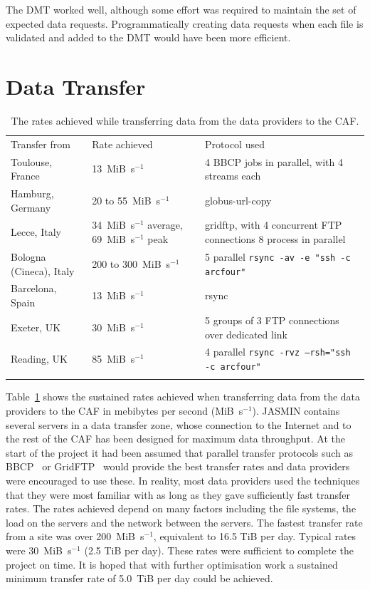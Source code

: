 \documentclass[gmd, manuscript]{copernicus}
\begin{document}
The DMT worked well, although some effort was required to maintain the set of expected data requests. Programmatically creating data requests  when each file is validated and added to the DMT would have been more efficient.

\section{Data Transfer}
\label{transfer_rates}

\begin{table}[ht]
	\caption{The rates achieved while transferring data from the data providers to the CAF.}
	\begin{tabular}{lll}
		\tophline
		Transfer from & Rate achieved & Protocol used \\
		\middlehline
		Toulouse, France & 13~MiB~s$^{-1}$ & 4 BBCP jobs in parallel, with 4 streams each \\
		Hamburg, Germany & 20 to 55~MiB~s$^{-1}$ & globus-url-copy \\
		Lecce, Italy & 34~MiB~s$^{-1}$ average, 69~MiB~s$^{-1}$ peak & gridftp, with 4 concurrent FTP connections 8 process in parallel \\
		Bologna (Cineca), Italy & 200 to 300~MiB~s$^{-1}$ & 5 parallel \texttt{rsync -av -e "ssh -c arcfour"} \\
		Barcelona, Spain & 13~MiB~s$^{-1}$ & rsync \\
		Exeter, UK & 30~MiB~s$^{-1}$ & 5 groups of 3 FTP connections over dedicated link \\
		Reading, UK & 85~MiB~s$^{-1}$ & 4 parallel \texttt{rsync -rvz --rsh="ssh -c arcfour"} \\
		\bottomhline
	\end{tabular}
	\belowtable{} %
	\label{rates_achieved}
\end{table}


Table~\ref{rates_achieved} shows the sustained rates achieved when transferring data from the data providers to the CAF in mebibytes per second (MiB~s$^{-1}$). JASMIN contains several servers in a data transfer zone, whose connection to the Internet and to the rest of the CAF has been designed for maximum data throughput. At the start of the project it had been assumed that parallel transfer protocols such as BBCP~\citep{bbcp} or GridFTP~\citep{Foster}\citep{Globus} would provide the best transfer rates and data providers were encouraged to use these. In reality, most data providers used the techniques that they were most familiar with as long as they gave sufficiently fast transfer rates. The rates achieved depend on many factors including the file systems, the load on the servers and the network between the servers. The fastest transfer rate from a site was over 200~MiB~s$^{-1}$, equivalent to 16.5 TiB per day. Typical rates were 30~MiB~s$^{-1}$ (2.5 TiB per day). These rates were sufficient to complete the project on time. It is hoped that with further optimisation work a sustained minimum transfer rate of 5.0~TiB per day could be achieved.
\end{document}
